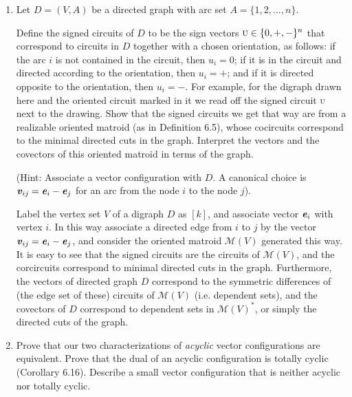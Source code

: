 \documentclass{article}
\begin{document}
\begin{enumerate}
\begin{proof}
    $\aDep(X) = \{\bi{z}: X\bi{z} = 0, \mathds{1}\bi{z} = 0\} = \{\bi{z}: \begin{pmatrix}
        \mathds{1} \\ X
    \end{pmatrix}\bi{z} = 0\} = \Dep(V)$.
\end{proof}

\item Let $D=(V,A)$ be a directed graph with arc set $A=\{1,2,\dots,n\}$. 

Define the signed circuits of $D$ to be the sign vectors $\textsc{u}\in\{0,+,-\}^n$ that correspond to circuits in $D$ together with a chosen orientation, as follows: if the arc $i$ is not contained in the circuit, then $u_i=0$; if it is in the circuit and directed according to the orientation, then $u_i=+$; and if it is directed opposite to the orientation, then $u_i=-$. For example, for the digraph drawn here and the oriented circuit marked in it we read oﬀ the signed circuit \textsc{u} next to the drawing. Show that the signed circuits we get that way are from a realizable oriented matroid (as in Definition 6.5), whose cocircuits correspond to the minimal directed cuts in the graph. Interpret the vectors and the covectors of this oriented matroid in terms of the graph.

(Hint: Associate a vector configuration with $D$. A canonical choice is $\textbf{\textit{v}}_{ij} = \textbf{\textit{e}}_i - \textbf{\textit{e}}_j$ for an arc from the node $i$ to the node $j$).

\begin{solution}
    Label the vertex set $V$ of a digraph $D$ as $[k]$, and associate vector $\textbf{\textit{e}}_i$ with vertex $i$. In this way associate a directed edge from $i$ to $j$ by the vector $\textbf{\textit{v}}_{ij} = \textbf{\textit{e}}_i - \textbf{\textit{e}}_j$, and consider the oriented matroid $\mathcal{M}(V)$ generated this way. It is easy to see that the signed circuits are the circuits of $\mathcal{M}(V)$, and the corcircuits correspond to minimal directed cuts in the graph. Furthermore, the vectors of directed graph $D$ correspond to the symmetric differences of (the edge set of these) circuits of $\mathcal{M}(V)$ (i.e. dependent sets), and the covectors of $D$ correspond to dependent sets in $\mathcal{M}(V)^*$, or simply the directed cuts of the graph.
\end{solution}

\item Prove that our two characterizations of \emph{acyclic} vector configurations are equivalent. Prove that the dual of an acyclic configuration is totally cyclic (Corollary 6.16). Describe a small vector configuration that is neither acyclic nor totally cyclic.


\end{enumerate}
\end{document}
